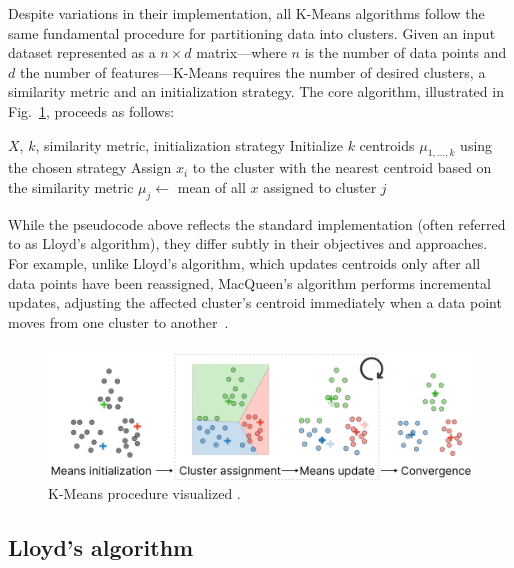 \documentclass[10pt,twocolumn,letterpaper]{article}
\begin{document}
Despite variations in their implementation, all K-Means algorithms follow the
same fundamental procedure for partitioning data into clusters. Given an input
dataset represented as a $n \times d$ matrix—where $n$ is the number of data
points and $d$ the number of features—K-Means requires the number of desired
clusters, a similarity metric and an initialization strategy. The core
algorithm, illustrated in Fig.~\ref{fig:kmeans-procedure}, proceeds as follows:
\begin{algorithmic}[1]
    \Require $X$, $k$, similarity metric, initialization strategy
    \State Initialize $k$ centroids $\mu_{1, \dots, k}$ using the chosen strategy
    \Repeat
    \State Assign $x_i$ to the cluster with the nearest centroid based on the similarity metric
    \EndFor
    \State $\mu_j\gets$ mean of all $x$ assigned to cluster $j$
    \EndFor
\end{algorithmic}
While the pseudocode above reflects the standard implementation (often referred
to as Lloyd’s algorithm), they differ subtly in their objectives and
approaches. For example, unlike Lloyd's algorithm, which updates centroids only
after all data points have been reassigned, MacQueen's algorithm performs
incremental updates, adjusting the affected cluster’s centroid immediately when
a data point moves from one cluster to another~\cite{Morissette2013}.

\begin{figure}[h]
    \centering
    \includegraphics[width=1\linewidth]{figures/K-Means procedure}
    \caption{K-Means procedure visualized \cite{Amidi2018}.}
    \label{fig:kmeans-procedure}
\end{figure}


\subsection{Lloyd's algorithm}\label{subsec:procedure-and-lloyd's-algorithm}
\end{document}
